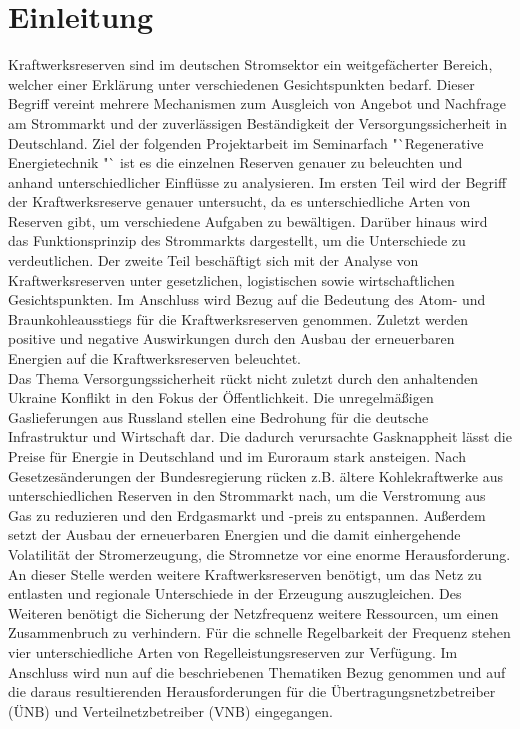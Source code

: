 \section{Einleitung}

	Kraftwerksreserven sind im deutschen Stromsektor ein weitgefächerter Bereich, welcher einer Erklärung unter verschiedenen Gesichtspunkten bedarf.
	Dieser Begriff vereint mehrere Mechanismen zum Ausgleich von Angebot und Nachfrage am Strommarkt und der zuverlässigen Beständigkeit der Versorgungssicherheit in Deutschland.
	Ziel der folgenden Projektarbeit im Seminarfach "`Regenerative Energietechnik "` ist es die einzelnen Reserven genauer zu beleuchten und anhand unterschiedlicher Einflüsse zu analysieren.
	Im ersten Teil wird der Begriff der Kraftwerksreserve genauer untersucht, da es unterschiedliche Arten von Reserven gibt, um verschiedene Aufgaben zu bewältigen.
	Darüber hinaus wird das Funktionsprinzip des Strommarkts dargestellt, um die Unterschiede zu verdeutlichen.
	Der zweite Teil beschäftigt sich mit der Analyse von Kraftwerksreserven unter gesetzlichen, logistischen sowie wirtschaftlichen Gesichtspunkten.
	Im Anschluss wird Bezug auf die Bedeutung des Atom- und Braunkohleausstiegs für die Kraftwerksreserven genommen.	
	Zuletzt werden positive und negative Auswirkungen durch den Ausbau der erneuerbaren Energien auf die Kraftwerksreserven beleuchtet. \\
	
	Das Thema Versorgungssicherheit rückt nicht zuletzt durch den anhaltenden
	Ukraine Konflikt in den Fokus der Öffentlichkeit.
	Die unregelmäßigen Gaslieferungen aus Russland stellen eine Bedrohung für die deutsche Infrastruktur und Wirtschaft dar.
	Die dadurch verursachte Gasknappheit lässt die Preise für Energie in Deutschland und im Euroraum stark ansteigen.
	Nach Gesetzesänderungen der Bundesregierung rücken z.B. ältere Kohlekraftwerke aus unterschiedlichen Reserven in den Strommarkt nach, um die Verstromung aus Gas zu reduzieren und den Erdgasmarkt und -preis zu entspannen.
	Außerdem setzt der Ausbau der erneuerbaren Energien und die damit einhergehende Volatilität der Stromerzeugung, die Stromnetze vor eine enorme Herausforderung. 
	An dieser Stelle werden weitere Kraftwerksreserven benötigt, um das Netz zu entlasten und regionale Unterschiede in der Erzeugung auszugleichen. 
	Des Weiteren benötigt die Sicherung der Netzfrequenz weitere Ressourcen, um einen Zusammenbruch zu verhindern. 
	Für die schnelle Regelbarkeit der Frequenz stehen vier unterschiedliche Arten von Regelleistungsreserven zur Verfügung. 
	Im Anschluss wird nun auf die beschriebenen Thematiken Bezug genommen und auf die daraus resultierenden Herausforderungen für die Übertragungsnetzbetreiber (ÜNB) und Verteilnetzbetreiber (VNB) eingegangen. 
	
	
	
	
	
	
	\clearpage
